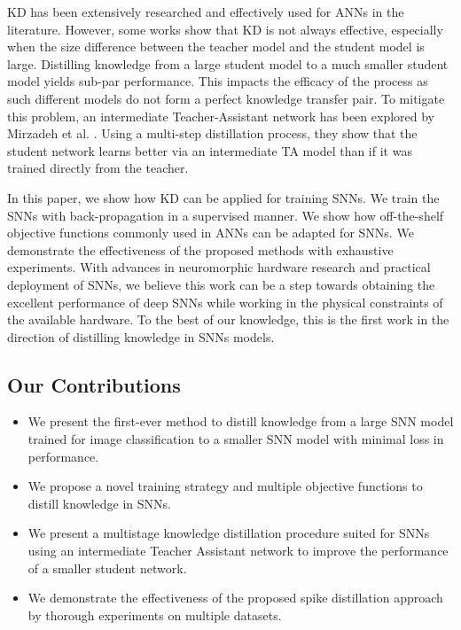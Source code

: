 \documentclass{article}
\begin{document}
KD has been extensively researched and effectively used for ANNs in the literature. However, some works show that KD is not always effective, especially when the size difference between the teacher model and the student model is large. Distilling knowledge from a large student model to a much smaller student model yields sub-par performance. This impacts the efficacy of the process as such different models do not form a perfect knowledge transfer pair. To mitigate this problem, an intermediate Teacher-Assistant network has been explored by Mirzadeh et al. \cite{mirzadeh2019improved}. Using a multi-step distillation process, they show that the student network learns better via an intermediate TA model than if it was trained directly from the teacher.

In this paper, we show how KD can be applied for training SNNs. We train the SNNs with back-propagation in a supervised manner. We show how off-the-shelf objective functions commonly used in ANNs can be adapted for SNNs. We demonstrate the effectiveness of the proposed methods with exhaustive experiments. With advances in neuromorphic hardware research and practical deployment of SNNs, we believe this work can be a step towards obtaining the excellent performance of deep SNNs while working in the physical constraints of the available hardware. To the best of our knowledge, this is the first work in the direction of distilling knowledge in SNNs models.

\subsection{Our Contributions}
\begin{itemize}
\item{We present the first-ever method to distill knowledge from a large SNN model trained for image classification to a smaller SNN model with minimal loss in performance.}
\item{We propose a novel training strategy and multiple objective functions to distill knowledge in SNNs.}
\item{We present a multistage knowledge distillation procedure suited for SNNs using an intermediate Teacher Assistant network to improve the performance of a smaller student network.}
\item{We demonstrate the effectiveness of the proposed spike distillation approach by thorough experiments on multiple datasets.}
\end{itemize}
\end{document}
